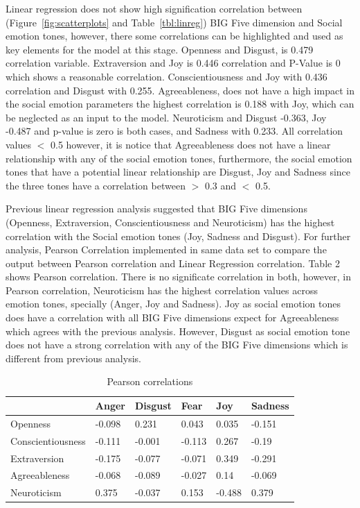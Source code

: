 \documentclass[graybox]{svmult}
\begin{document}
Linear regression does not show high signification correlation between
(Figure~\ref{fig:scatterplots} and Table~\ref{tbl:linreg}) BIG Five
dimension and Social emotion tones, however, there some correlations
can be highlighted and used as key elements for the model at this
stage. Openness and Disgust, is 0.479 correlation
variable. Extraversion and Joy is 0.446 correlation and P-Value is 0
which shows a reasonable correlation. Conscientiousness and Joy with
0.436 correlation and Disgust with 0.255. Agreeableness, does not have
a high impact in the social emotion parameters the highest correlation
is 0.188 with Joy, which can be neglected as an input to the
model. Neuroticism and Disgust -0.363, Joy -0.487 and p-value is zero
is both cases, and Sadness with 0.233. All correlation values $<$ 0.5
however, it is notice that Agreeableness does not have a linear
relationship with any of the social emotion tones, furthermore, the
social emotion tones that have a potential linear relationship are
Disgust, Joy and Sadness since the three tones have a correlation
between $>$ 0.3 and $<$ 0.5.

Previous linear regression analysis suggested that BIG Five dimensions
(Openness, Extraversion, Conscientiousness and Neuroticism) has the
highest correlation with the Social emotion tones (Joy, Sadness and
Disgust). For further analysis, Pearson Correlation implemented in
same data set to compare the output between Pearson correlation and
Linear Regression correlation. Table 2 shows Pearson
correlation. There is no significate correlation in both, however, in
Pearson correlation, Neuroticism has the highest correlation values
across emotion tones, specially (Anger, Joy and Sadness). Joy as
social emotion tones does have a correlation with all BIG Five
dimensions expect for Agreeableness which agrees with the previous
analysis. However, Disgust as social emotion tone does not have a
strong correlation with any of the BIG Five dimensions which is
different from previous analysis. 

\begin{table}[!ht]
\centering
\begin{tabular}{@{}llllll@{}}
\toprule
                  & Anger  & Disgust & Fear   & Joy    & Sadness \\ 
\midrule
Openness          & -0.098 & 0.231   & 0.043  & 0.035  & -0.151  \\
Conscientiousness & -0.111 & -0.001  & -0.113 & 0.267  & -0.19   \\
Extraversion      & -0.175 & -0.077  & -0.071 & 0.349  & -0.291  \\
Agreeableness     & -0.068 & -0.089  & -0.027 & 0.14   & -0.069  \\
Neuroticism       & 0.375  & -0.037  & 0.153  & -0.488 & 0.379   \\ 

\bottomrule
\end{tabular}
\caption{Pearson correlations}
\label{tab:pearson}
\end{table}
\end{document}
